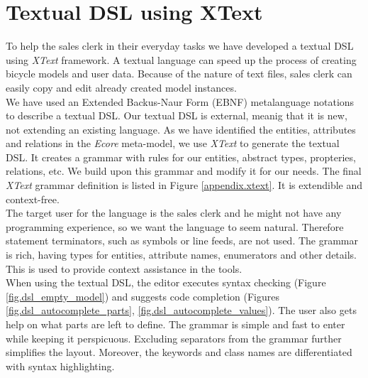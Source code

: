 \section{Textual DSL using XText}
\label{sec.xtext}

\noindent
To help the sales clerk in their everyday tasks we have developed a textual DSL
using \emph{XText} framework. A textual language can speed up the process of
creating bicycle models and user data. Because of the nature of text files,
sales clerk can easily copy and edit already created model instances.\\

\noindent
We have used an Extended Backus-Naur Form (EBNF)
metalanguage notations to describe a textual DSL. Our textual DSL is external,
meanig that it is new, not extending an existing language. As we have identified the entities,
attributes and relations in the \emph{Ecore} meta-model, we use
\emph{XText} to generate the textual DSL. It creates a grammar with rules for
our entities, abstract types, propteries, relations, etc. We build upon this grammar and modify it for our needs. The final \emph{XText} grammar definition is listed in Figure
\ref{appendix.xtext}. It is extendible and context-free.\\

\noindent
The target user for the language is the sales clerk and he might not
have any programming experience, so we want the language to seem
natural. Therefore statement terminators, such as symbols or line feeds, are not
used. The grammar is rich, having types for entities, attribute
names, enumerators and other details. This is used to provide context assistance
in the tools.\\

\noindent
When using the textual DSL, the editor executes syntax checking (Figure
\ref{fig.dsl_empty_model}) and suggests code completion (Figures \ref{fig.dsl_autocomplete_parts},
\ref{fig.dsl_autocomplete_values}). The user also gets help on what parts
are left to define. The grammar is simple and fast to enter while keeping it
perspicuous. Excluding separators from the grammar further simplifies the layout.
Moreover, the keywords and class names are differentiated with syntax
highlighting.\\
